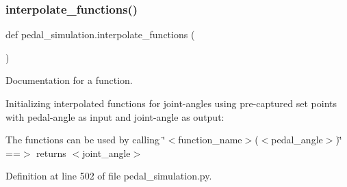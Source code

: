 \subsubsection{\texorpdfstring{interpolate\_functions()}{interpolate\_functions()}}
{\footnotesize\ttfamily def pedal\+\_\+simulation.\+interpolate\+\_\+functions (\begin{DoxyParamCaption}{ }\end{DoxyParamCaption})}



Documentation for a function. 

Initializing interpolated functions for joint-\/angles using pre-\/captured set points with pedal-\/angle as input and joint-\/angle as output\+:

The functions can be used by calling \char`\"{}$<$function\+\_\+name$>$($<$pedal\+\_\+angle$>$)\char`\"{} ==$>$ returns $<$joint\+\_\+angle$>$ 

Definition at line 502 of file pedal\+\_\+simulation.\+py.


